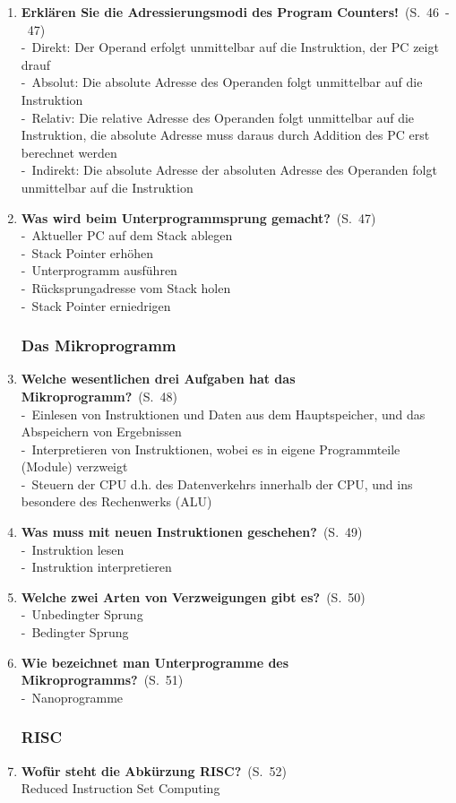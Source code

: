 \documentclass[a4paper,12pt]{article}
\newcommand{\question}[3]{\pagebreak[3]\item {\textbf{#1?}}\ (S.\ #2)#3}
\newcommand{\statement}[3]{\pagebreak[3]\item {\textbf{#1!}}\ (S.\ #2)#3}
\newcommand{\catchword}[1]{\\-\ #1}
\newcommand{\normaltext}[1]{\\#1}
\newcommand{\page}[1]{#1}
\newcommand{\pages}[2]{#1\ -\ #2}
\begin{document}
\begin{enumerate}
  \statement{Erklären Sie die Adressierungsmodi des Program Counters}{\pages{46}{47}}
  {
    \catchword{Direkt: Der Operand erfolgt unmittelbar auf die Instruktion, der PC zeigt drauf}
    \catchword{Absolut: Die absolute Adresse des Operanden folgt unmittelbar auf die Instruktion}
    \catchword{Relativ: Die relative Adresse des Operanden folgt unmittelbar auf die Instruktion,
               die absolute Adresse muss daraus durch Addition des PC erst berechnet werden}
    \catchword{Indirekt: Die absolute Adresse der absoluten Adresse des Operanden folgt unmittelbar
               auf die Instruktion}
  }

  \question{Was wird beim Unterprogrammsprung gemacht}{\page{47}}
  {
    \catchword{Aktueller PC auf dem Stack ablegen}
    \catchword{Stack Pointer erhöhen}
    \catchword{Unterprogramm ausführen}
    \catchword{Rücksprungadresse vom Stack holen}
    \catchword{Stack Pointer erniedrigen}
  }

  \subsubsection{Das Mikroprogramm}

  \question{Welche wesentlichen drei Aufgaben hat das Mikroprogramm}{\page{48}}
  {
    \catchword{Einlesen von Instruktionen und Daten aus dem Hauptspeicher, und das Abspeichern 
               von Ergebnissen}
    \catchword{Interpretieren von Instruktionen, wobei es in eigene Programmteile (Module) verzweigt}
    \catchword{Steuern der CPU d.h. des Datenverkehrs innerhalb der CPU, und ins besondere 
               des Rechenwerks (ALU)}
  }

  \question{Was muss mit neuen Instruktionen geschehen}{\page{49}}
  {
    \catchword{Instruktion lesen}
    \catchword{Instruktion interpretieren}
  }

  \question{Welche zwei Arten von Verzweigungen gibt es}{\page{50}}
  {
    \catchword{Unbedingter Sprung}
    \catchword{Bedingter Sprung}
  }

  \question{Wie bezeichnet man Unterprogramme des Mikroprogramms}{\page{51}}
  {
    \catchword{Nanoprogramme}
  }

  \subsubsection{RISC}

  \question{Wofür steht die Abkürzung RISC}{\page{52}}
  {
    \normaltext{Reduced Instruction Set Computing}
  }


\end{enumerate}
\end{document}
